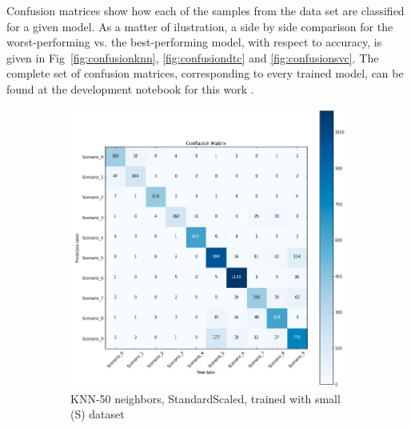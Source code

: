 Confusion matrices show how each of the samples from the data set are classified for a given model. As a matter of ilustration, a side by side comparison for the worst-performing vs. the best-performing model, with respect to accuracy, is given in Fig~\ref{fig:confusionknn}, \ref{fig:confusiondtc} and \ref{fig:confusionsvc}. The complete set of confusion matrices, corresponding to every trained model, can be found at the development notebook for this work \cite{repo:cognitive_radio_ml}.


\begin{figure}[!htb]
    \captionsetup[subfigure]{justification=centering}
    \centering
    \begin{subfigure}[htb]{0.49\textwidth}
        \centering
        \includegraphics[width=\linewidth]{figures/knn_scaled_S_50}
        \caption{KNN-50 neighbors, StandardScaled, trained with small (S) dataset}
        \label{fig:knn_2}
    \end{subfigure}
    \begin{subfigure}[htb]{0.49\textwidth}
        \centering

\end{subfigure}
\end{figure}
